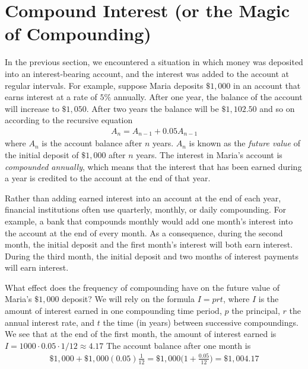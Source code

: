 \documentclass[10pt,]{book}
\theoremstyle{ptxdefinitionnotitle}
\theoremstyle{ptxdefinitiontitle}
\theoremstyle{ptxdefinitionnotitle}
\theoremstyle{ptxdefinitiontitle}
\theoremstyle{ptxdefinitionnotitle}
\theoremstyle{ptxdefinitiontitle}
\numberwithin{equation}{section}
\begin{document}
\section[{Compound Interest (or the Magic of Compounding)}]{Compound Interest (or the Magic of Compounding)}\label{chapter04-section05}
\hypertarget{p-196}{}%
In the previous section, we encountered a situation in which money was deposited into an interest-bearing account, and the interest was added to the account at regular intervals.  For example, suppose Maria deposits \(\$1,000\) in an account that earns interest at a rate of \(5\%\) annually.  After one year, the balance of the account will increase to \(\$1,050\).  After two years the balance will be \(\$1,102.50\) and so on according to the recursive equation%
%
\begin{gather*}
A_n = A_{n-1} + 0.05 A_{n-1}
\end{gather*}
\hypertarget{p-197}{}%
where \(A_n\) is the account balance after \(n\) years. \(A_n\) is known as the \emph{future value} of the initial deposit of \(\$1,000\) after \(n\) years.  The interest in Maria's account is \emph{compounded annually}, which means that the interest that has been earned during a year is credited to the account at the end of that year.%
\par
\hypertarget{p-198}{}%
Rather than adding earned interest into an account at the end of each year, financial institutions often use quarterly, monthly, or daily compounding.  For example, a bank that compounds monthly would add one month's interest into the account at the end of every month. As a consequence, during the second month, the initial deposit and the first month's interest will both earn interest.  During the third month, the initial deposit and two months of interest payments will earn interest.%
\par
\hypertarget{p-199}{}%
What effect does the frequency of compounding have on the future value of Maria's \(\$1,000\) deposit?  We will rely on the formula \(I=prt\), where \(I\) is the amount of interest earned in one compounding time period, \(p\) the principal, \(r\) the annual interest rate, and \(t\) the time (in years) between successive compoundings. We see that at the end of the first month, the amount of interest earned is \(I=1000 \cdot 0.05 \cdot 1/12 \approx 4.17\)  The account balance after one month is%
%
\begin{gather*}
\$1,000 + \$1,000(0.05) \frac{1}{12} = \$1,000 \bigg( 1 + \frac{0.05}{12}\bigg) = \$1,004.17
\end{gather*}
\end{document}

